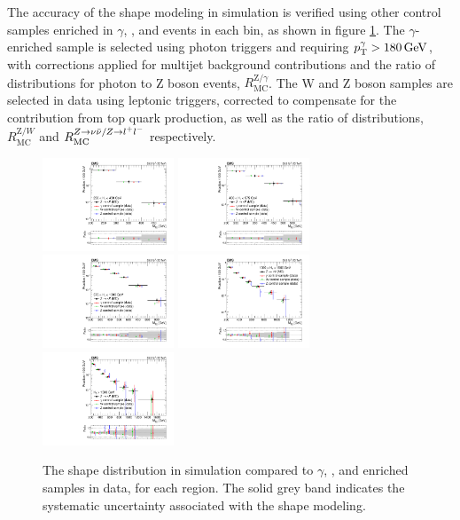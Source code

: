 The accuracy of the \mttwo shape modeling in simulation is verified using other control samples enriched in $\gamma$, \wlnu, and \zll events in each \HT bin, as shown in figure \ref{fig:zinvMt2Shape}. The $\gamma$-enriched sample is selected using photon triggers and requiring $p_{\mathrm{T}}^{\gamma} > 180\,\text{Ge\hspace{-.08em}V}$, with corrections applied for multijet background contributions and the ratio of \mttwo distributions for photon to Z boson events, $R_{\mathrm{MC}}^{\mathrm{Z}/\gamma}$. The W and Z boson samples are selected in data using leptonic triggers, corrected to compensate for the contribution from top quark production, as well as the ratio of \mttwo distributions, $R_{\mathrm{MC}}^{\mathrm{Z}/W}$ and $R_{\mathrm{MC}}^{Z\rightarrow\nu\bar{\nu}/Z\rightarrow l^+ l^-}$ respectively.
\begin{figure}
	\centering
	\includegraphics[width=0.35\textwidth]{backgrounds/figs/MT2VL_W_GJ_log}
	\includegraphics[width=0.35\textwidth]{backgrounds/figs/MT2L_W_GJ_log}
	\includegraphics[width=0.35\textwidth]{backgrounds/figs/MT2M_W_GJ_log}
	\includegraphics[width=0.35\textwidth]{backgrounds/figs/MT2H_W_GJ_log}
	\includegraphics[width=0.35\textwidth]{backgrounds/figs/MT2UH_W_GJ_log}
	\caption{The \mttwo shape distribution in \znunu simulation compared to $\gamma$, \wlnu, and \zll enriched samples in data, for each \HT region. The solid grey band indicates the systematic uncertainty associated with the \mttwo shape modeling.}
	\label{fig:zinvMt2Shape}
\end{figure}

